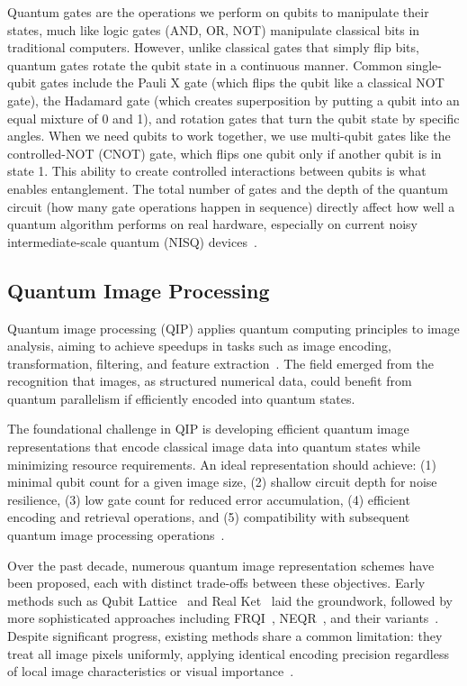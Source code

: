 \documentclass{ipol}
\begin{document}
Quantum gates are the operations we perform on qubits to manipulate their states, much like logic gates (AND, OR, NOT) manipulate classical bits in traditional computers. However, unlike classical gates that simply flip bits, quantum gates rotate the qubit state in a continuous manner. Common single-qubit gates include the Pauli X gate (which flips the qubit like a classical NOT gate), the Hadamard gate (which creates superposition by putting a qubit into an equal mixture of 0 and 1), and rotation gates that turn the qubit state by specific angles. When we need qubits to work together, we use multi-qubit gates like the controlled-NOT (CNOT) gate, which flips one qubit only if another qubit is in state 1. This ability to create controlled interactions between qubits is what enables entanglement. The total number of gates and the depth of the quantum circuit (how many gate operations happen in sequence) directly affect how well a quantum algorithm performs on real hardware, especially on current noisy intermediate-scale quantum (NISQ) devices~\cite{bib9,bib10,bib11}.

\subsection{Quantum Image Processing}

Quantum image processing (QIP) applies quantum computing principles to image analysis, aiming to achieve speedups in tasks such as image encoding, transformation, filtering, and feature extraction~\cite{bib12,bib13}. The field emerged from the recognition that images, as structured numerical data, could benefit from quantum parallelism if efficiently encoded into quantum states.

The foundational challenge in QIP is developing efficient quantum image representations that encode classical image data into quantum states while minimizing resource requirements. An ideal representation should achieve: (1) minimal qubit count for a given image size, (2) shallow circuit depth for noise resilience, (3) low gate count for reduced error accumulation, (4) efficient encoding and retrieval operations, and (5) compatibility with subsequent quantum image processing operations~\cite{bib14,bib15}.

Over the past decade, numerous quantum image representation schemes have been proposed, each with distinct trade-offs between these objectives. Early methods such as Qubit Lattice~\cite{bib16} and Real Ket~\cite{bib17} laid the groundwork, followed by more sophisticated approaches including FRQI~\cite{bib18}, NEQR~\cite{bib19}, and their variants~\cite{bib20,bib21,bib22,bib23}. Despite significant progress, existing methods share a common limitation: they treat all image pixels uniformly, applying identical encoding precision regardless of local image characteristics or visual importance~\cite{bib24,bib25}.
\end{document}
